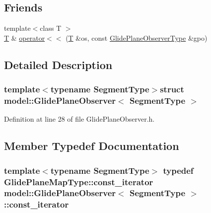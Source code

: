 \subsection*{Friends}
\begin{DoxyCompactItemize}
\item 
{\footnotesize template$<$class T $>$ }\\\hyperlink{_spline_node_base__corder1_8h_a82692d3a5502b91460591f1d5504314a}{T} \& \hyperlink{structmodel_1_1_glide_plane_observer_a45ee80f9e9315c3b5ddd61193dacd6a0}{operator$<$$<$} (\hyperlink{_spline_node_base__corder1_8h_a82692d3a5502b91460591f1d5504314a}{T} \&os, const \hyperlink{structmodel_1_1_glide_plane_observer_a008ca4c47f513aff15d4d3b3603707f8}{Glide\+Plane\+Observer\+Type} \&gpo)
\end{DoxyCompactItemize}


\subsection{Detailed Description}
\subsubsection*{template$<$typename Segment\+Type$>$struct model\+::\+Glide\+Plane\+Observer$<$ Segment\+Type $>$}



Definition at line 28 of file Glide\+Plane\+Observer.\+h.



\subsection{Member Typedef Documentation}
\hypertarget{structmodel_1_1_glide_plane_observer_afcc36252a3e72359768cef30011a9af6}{}
\subsubsection[{const\+\_\+iterator}]{\setlength{\rightskip}{0pt plus 5cm}template$<$typename Segment\+Type$>$ typedef Glide\+Plane\+Map\+Type\+::const\+\_\+iterator {\bf model\+::\+Glide\+Plane\+Observer}$<$ Segment\+Type $>$\+::{\bf const\+\_\+iterator}}\label{structmodel_1_1_glide_plane_observer_afcc36252a3e72359768cef30011a9af6}


